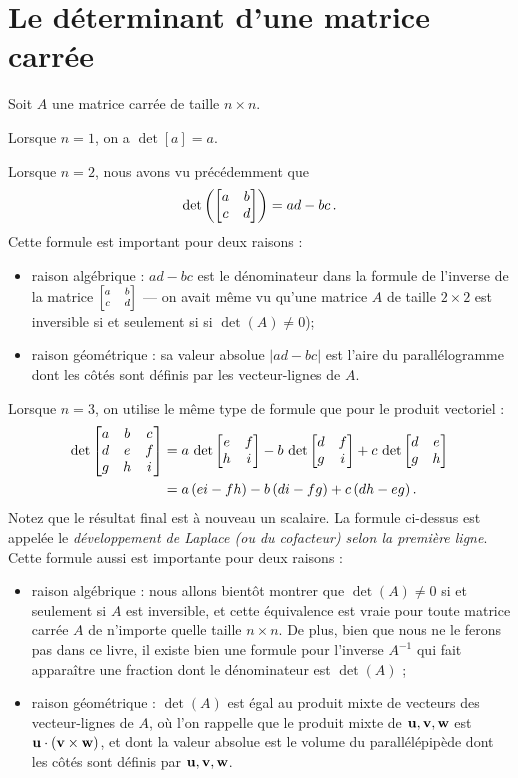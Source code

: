 \section{Le déterminant d'une matrice carrée}

Soit $A$ une matrice carrée de taille $n\times n$.  

Lorsque $n=1$, on a $\det[a] = a$.

Lorsque $n=2$, nous avons
vu  précédemment que
$$
\det\left( \left[ \begin{matrix} a&b\\c&d \end{matrix} \right] \right) = ad-bc\,.
$$
Cette formule est important pour deux raisons :
\begin{itemize}
\item raison algébrique : $ad-bc$ est le dénominateur dans la formule de l'inverse de la matrice $\scriptsize\left[ \begin{matrix} a&b\\c&d \end{matrix} \right]$ --- on avait même vu qu'une matrice $A$ de taille $2\times2$ est inversible si et seulement si
si $\det(A) \neq 0$);
\item raison géométrique : sa valeur absolue $|ad-bc|$ est l'aire du parallélogramme dont les côtés sont définis par les vecteur-lignes de $A$.
\end{itemize}

\medskip
Lorsque $n=3$, on utilise le même type de formule que pour le produit vectoriel :
\begin{align*}
\det\left[ \begin{matrix} a&b&c\\d&e&f\\g&h&i \end{matrix} \right] &= a\,\det\left[ \begin{matrix} e&f\\h&i \end{matrix} \right] - b\,\det\left[ \begin{matrix} d&f\\g&i \end{matrix} \right] + c\,\det\left[ \begin{matrix} d&e\\g&h \end{matrix} \right]\\
&= a\,(ei-fh) - b\,(di-fg) +c\,(dh-eg)\,.
\end{align*}
Notez que le résultat final est à nouveau un scalaire.  La formule ci-dessus
est appelée le \emph{développement de Laplace (ou du cofacteur) selon la première ligne}.
Cette formule aussi est importante pour deux raisons :
\begin{itemize}
\item raison algébrique : nous allons bientôt montrer que $\det(A) \neq 0$ si et seulement si $A$
est inversible, et cette équivalence est vraie pour toute matrice carrée $A$ de n'importe quelle taille $n\times n$. De plus, bien que nous ne le ferons pas dans ce livre, il existe bien
une formule pour l'inverse $A^{-1}$ qui fait apparaître une fraction dont le dénominateur est $\det(A)$ ;
\item raison géométrique : $\det(A)$ est égal au produit mixte de vecteurs des vecteur-lignes de $A$, où l'on rappelle que le produit mixte de $\mathbf{u}, \mathbf{v}, \mathbf{w}$ est $\mathbf{u} \cdot (\mathbf{v} \times \mathbf{w})$, et dont la valeur absolue est le volume du parallélépipède dont les côtés sont définis par $\mathbf{u}, \mathbf{v}, \mathbf{w}$.  
\end{itemize}

